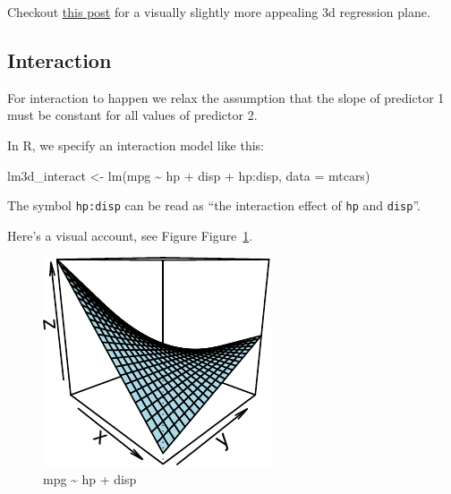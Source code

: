\documentclass[
  letterpaper,
  DIV=11,
  numbers=noendperiod]{scrreprt}
\newenvironment{Shaded}{\begin{snugshade}}{\end{snugshade}}
\newcommand{\AttributeTok}[1]{\textcolor[rgb]{0.40,0.45,0.13}{#1}}
\newcommand{\FunctionTok}[1]{\textcolor[rgb]{0.28,0.35,0.67}{#1}}
\newcommand{\NormalTok}[1]{\textcolor[rgb]{0.00,0.23,0.31}{#1}}
\newcommand{\OtherTok}[1]{\textcolor[rgb]{0.00,0.23,0.31}{#1}}
\newcommand{\SpecialCharTok}[1]{\textcolor[rgb]{0.37,0.37,0.37}{#1}}
\theoremstyle{definition}
\theoremstyle{definition}
\theoremstyle{remark}
\begin{document}
Checkout
\href{https://data-se.netlify.app/2022/04/19/3d-regression-plane-with-scatter-plot/}{this
post} for a visually slightly more appealing 3d regression plane.

\hypertarget{interaction-1}{%
\subsection{Interaction}\label{interaction-1}}

For interaction to happen we relax the assumption that the slope of
predictor 1 must be constant for all values of predictor 2.

In R, we specify an interaction model like this:

\begin{Shaded}
\begin{Highlighting}[]
\NormalTok{lm3d\_interact }\OtherTok{\textless{}{-}} \FunctionTok{lm}\NormalTok{(mpg }\SpecialCharTok{\textasciitilde{}}\NormalTok{ hp }\SpecialCharTok{+}\NormalTok{ disp }\SpecialCharTok{+}\NormalTok{ hp}\SpecialCharTok{:}\NormalTok{disp, }\AttributeTok{data =}\NormalTok{ mtcars)}
\end{Highlighting}
\end{Shaded}

The symbol \texttt{hp:disp} can be read as ``the interaction effect of
\texttt{hp} and \texttt{disp}''.

Here's a visual account, see Figure Figure~\ref{fig-mtcars3d-interact}.

\begin{figure}

{\centering \includegraphics{./regression2_files/figure-pdf/fig-mtcars3d-interact-1.pdf}

}

\caption{\label{fig-mtcars3d-interact}mpg \textasciitilde{} hp + disp}

\end{figure}
\end{document}
